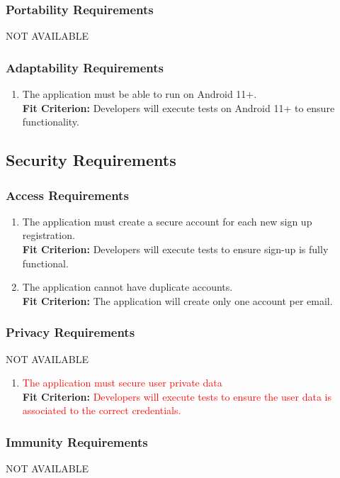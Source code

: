 \documentclass[12pt,letterpaper]{article}
\begin{document}
\subsubsection{Portability Requirements}
NOT AVAILABLE
\subsubsection{Adaptability Requirements}
\begin{enumerate}[resume*] 
	\item The application must be able to run on Android 11+. \\
	{\textbf{Fit Criterion:} Developers will execute tests on Android 11+ to ensure functionality. }
\end{enumerate}
\subsection{Security Requirements}
\subsubsection{Access Requirements}
\begin{enumerate}[{SE}1.] 
	\item The application must create a secure account for each new sign up registration. \\
	{\textbf{Fit Criterion:} Developers will execute tests to ensure sign-up is fully functional. }
	\item The application cannot have duplicate accounts.  \\
	{\textbf{Fit Criterion:} The application will create only one account per email. }
\end{enumerate}
\subsubsection{Privacy Requirements}
NOT AVAILABLE
\begin{enumerate}[{PR}1.] 
	\item {\textcolor{red}{The application must secure user private data}} \\
	{\textbf{Fit Criterion:} {\textcolor{red}{Developers will execute tests to ensure the user data is associated to the correct credentials.}}}
\end{enumerate}
\subsubsection{Immunity Requirements}
NOT AVAILABLE
\end{document}
